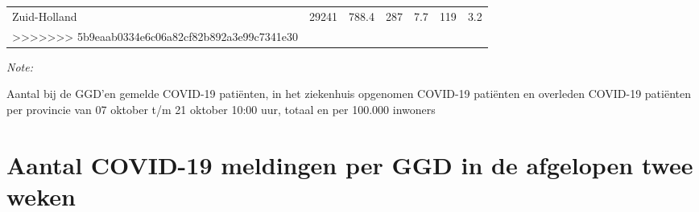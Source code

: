 \documentclass[
  english,
  man,floatsintext]{apa6}
\begin{document}
\begin{table}[H]
\begin{threeparttable}
\begin{tabular}{lrrrrrr}
Zuid-Holland & 29241 & 788.4 & 287 & 7.7 & 119 & 3.2\\
>>>>>>> 5b9eaab0334e6c06a82cf82b892a3e99c7341e30
\bottomrule
\end{tabular}
\begin{tablenotes}
\item \textit{Note: } 
\item Aantal bij de GGD’en gemelde COVID-19 patiënten, in het ziekenhuis opgenomen COVID-19 patiënten en overleden COVID-19 patiënten per provincie van 07 oktober t/m 21 oktober 10:00 uur, totaal en per 100.000 inwoners
\end{tablenotes}
\end{threeparttable}
\end{table}

\newpage

\hypertarget{aantal-covid-19-meldingen-per-ggd-in-de-afgelopen-twee-weken}{%
\section{Aantal COVID-19 meldingen per GGD in de afgelopen twee weken}\label{aantal-covid-19-meldingen-per-ggd-in-de-afgelopen-twee-weken}}
\end{document}
